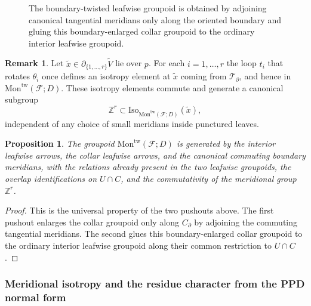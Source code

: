 \documentclass[11pt]{amsart}
\theoremstyle{plain}
\newtheorem{proposition}[theorem]{Proposition}
\theoremstyle{definition}
\newtheorem{remark}[theorem]{Remark}
\newcommand{\Mon}{\mathrm{Mon}}
\newcommand{\fol}{\mathcal{F}}
\newcommand{\ZZ}{\mathbb Z}
\theoremstyle{definition}
\begin{document}
\begin{figure}[t]
\centering
{}
\caption{The boundary-twisted leafwise groupoid is obtained by adjoining canonical tangential meridians only along the oriented boundary and gluing this boundary-enlarged collar groupoid to the ordinary interior leafwise groupoid.}
\label{fig:pushout}
\end{figure}

\begin{remark}\label{rem:canonical-meridians}
Let $\tilde x\in\partial_{\{1,\dots,r\}}\widetilde V$ lie over $p$. For each $i=1,\dots,r$ the loop $t_i$ that rotates $\theta_i$ once defines an isotropy element at $\tilde x$ coming from $\mathcal T_\partial$, and hence in $\Mon^{\mathrm{tw}}(\fol;D)$. These isotropy elements commute and generate a canonical subgroup
$$
\ZZ^r\subset \mathrm{Iso}_{\Mon^{\mathrm{tw}}(\fol;D)}(\tilde x),
$$
independent of any choice of small meridians inside punctured leaves.
\end{remark}

\begin{proposition} \label{prop:pushout}
The groupoid $\Mon^{\mathrm{tw}}(\fol;D)$ is generated by the interior leafwise arrows, the collar leafwise arrows, and the canonical commuting boundary meridians, with the relations already present in the two leafwise groupoids, the overlap identifications on $U\cap C$, and the commutativity of the meridional group $\ZZ^r$.
\end{proposition}

\begin{proof}
This is the universal property of the two pushouts above. The first pushout enlarges the collar groupoid only along $C_\partial$ by adjoining the commuting tangential meridians. The second glues this boundary-enlarged collar groupoid to the ordinary interior leafwise groupoid along their common restriction to $U\cap C$.
\end{proof}

 

\subsubsection*{Meridional isotropy and the residue character from the PPD normal form}
\end{document}
